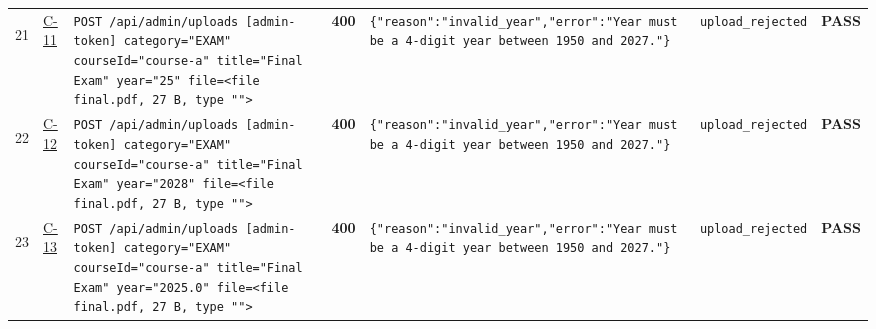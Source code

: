 \documentclass[10pt,a4paper]{article}
\begin{document}
\begin{landscape}
\begin{longtable}{@{}P{0.6cm}P{0.9cm}P{8.5cm}P{1.0cm}P{6.2cm}P{4.2cm}P{1.1cm}@{}}
\hypertarget{call21}{21} & \hyperlink{test-C-11}{C-11} & \texttt{POST /\allowbreak{}api/\allowbreak{}admin/\allowbreak{}uploads [admin-\allowbreak{}token] category=\allowbreak{}"\allowbreak{}EXAM"\allowbreak{} courseId=\allowbreak{}"\allowbreak{}course-\allowbreak{}a"\allowbreak{} title=\allowbreak{}"\allowbreak{}Final Exam"\allowbreak{} year=\allowbreak{}"\allowbreak{}25"\allowbreak{} file=\allowbreak{}<file final.\allowbreak{}pdf,\allowbreak{} 27 B,\allowbreak{} type "\allowbreak{}"\allowbreak{}>} & \textcolor{warnamber}{\textbf{400}} & \texttt{\{"\allowbreak{}reason"\allowbreak{}:\allowbreak{}"\allowbreak{}invalid\_\allowbreak{}year"\allowbreak{},\allowbreak{}"\allowbreak{}error"\allowbreak{}:\allowbreak{}"\allowbreak{}Year must be a 4-\allowbreak{}digit year between 1950 and 2027.\allowbreak{}"\allowbreak{}\}} & \texttt{upload\_\allowbreak{}rejected} & \textcolor{passgreen}{\textbf{PASS}} \\
\hypertarget{call22}{22} & \hyperlink{test-C-12}{C-12} & \texttt{POST /\allowbreak{}api/\allowbreak{}admin/\allowbreak{}uploads [admin-\allowbreak{}token] category=\allowbreak{}"\allowbreak{}EXAM"\allowbreak{} courseId=\allowbreak{}"\allowbreak{}course-\allowbreak{}a"\allowbreak{} title=\allowbreak{}"\allowbreak{}Final Exam"\allowbreak{} year=\allowbreak{}"\allowbreak{}2028"\allowbreak{} file=\allowbreak{}<file final.\allowbreak{}pdf,\allowbreak{} 27 B,\allowbreak{} type "\allowbreak{}"\allowbreak{}>} & \textcolor{warnamber}{\textbf{400}} & \texttt{\{"\allowbreak{}reason"\allowbreak{}:\allowbreak{}"\allowbreak{}invalid\_\allowbreak{}year"\allowbreak{},\allowbreak{}"\allowbreak{}error"\allowbreak{}:\allowbreak{}"\allowbreak{}Year must be a 4-\allowbreak{}digit year between 1950 and 2027.\allowbreak{}"\allowbreak{}\}} & \texttt{upload\_\allowbreak{}rejected} & \textcolor{passgreen}{\textbf{PASS}} \\
\hypertarget{call23}{23} & \hyperlink{test-C-13}{C-13} & \texttt{POST /\allowbreak{}api/\allowbreak{}admin/\allowbreak{}uploads [admin-\allowbreak{}token] category=\allowbreak{}"\allowbreak{}EXAM"\allowbreak{} courseId=\allowbreak{}"\allowbreak{}course-\allowbreak{}a"\allowbreak{} title=\allowbreak{}"\allowbreak{}Final Exam"\allowbreak{} year=\allowbreak{}"\allowbreak{}2025.\allowbreak{}0"\allowbreak{} file=\allowbreak{}<file final.\allowbreak{}pdf,\allowbreak{} 27 B,\allowbreak{} type "\allowbreak{}"\allowbreak{}>} & \textcolor{warnamber}{\textbf{400}} & \texttt{\{"\allowbreak{}reason"\allowbreak{}:\allowbreak{}"\allowbreak{}invalid\_\allowbreak{}year"\allowbreak{},\allowbreak{}"\allowbreak{}error"\allowbreak{}:\allowbreak{}"\allowbreak{}Year must be a 4-\allowbreak{}digit year between 1950 and 2027.\allowbreak{}"\allowbreak{}\}} & \texttt{upload\_\allowbreak{}rejected} & \textcolor{passgreen}{\textbf{PASS}} \\

\end{longtable}
\end{landscape}
\end{document}
